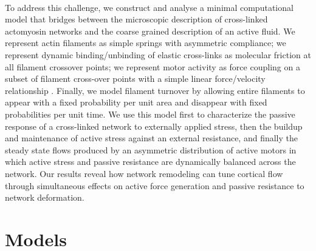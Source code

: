 \documentclass[10pt,letterpaper]{article}
\begin{document}
\paragraph{}  To address this challenge, we construct and analyse a minimal computational model that bridges between the microscopic description of cross-linked actomyosin networks and the coarse grained description of an active fluid.  We represent actin filaments as simple springs with asymmetric compliance; we represent dynamic binding/unbinding of elastic cross-links as molecular friction \cite{theo_friction,theo_frictionSam,theo_molefric} at all filament crossover points; we represent motor activity as force coupling on a subset of filament cross-over points with a simple linear force/velocity relationship \cite{theo_frictionShila}.  Finally, we model filament turnover by allowing entire filaments to appear with a fixed probability per unit area and disappear with fixed probabilities per unit time. We use this model first to characterize the passive response of a cross-linked network to externally applied stress, then the buildup and maintenance of active stress against an external resistance, and finally the steady state flows produced by an asymmetric distribution of active motors in which active stress and passive resistance are dynamically balanced across the network.  Our results reveal how network remodeling can tune cortical flow through simultaneous effects on active force generation and passive resistance to network deformation. 
  

\section*{Models}
\end{document}
